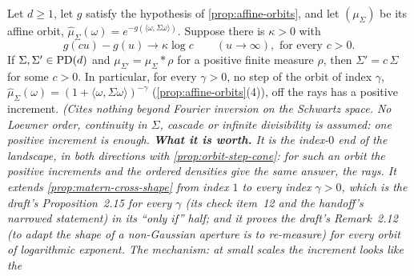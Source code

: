 \begin{proposition}
\label{prop:log-orbit-rays}
\leanok
Let $d \ge 1$, let $g$ satisfy the hypothesis of \ref{prop:affine-orbits}, and let $(\mu_\Sigma)$
be its affine orbit, $\widehat\mu_\Sigma(\omega) = e^{-g(\langle\omega,\Sigma\omega\rangle)}$. Suppose
there is $\kappa > 0$ with
\[
  g(cu) - g(u) \to \kappa\log c \qquad (u \to \infty), \text{ for every } c > 0 .
\]
If $\Sigma, \Sigma' \in \mathrm{PD}(d)$ and $\mu_{\Sigma'} = \mu_\Sigma * \rho$ for a positive finite measure
$\rho$, then $\Sigma' = c\,\Sigma$ for some $c > 0$. In particular, for every $\gamma > 0$, no step
of the \Matern{} orbit of index $\gamma$, $\widehat\mu_\Sigma(\omega) = (1 + \langle\omega,\Sigma
\omega\rangle)^{-\gamma}$ (\ref{prop:affine-orbits}(4)), off the rays has a positive increment.
\statusT\quad\emph{(Cites nothing beyond Fourier inversion on the Schwartz space. No
Loewner order, continuity in $\Sigma$, cascade or infinite divisibility is assumed: one positive
increment is enough. \textbf{What it is worth.} It is the index-$0$ end of the landscape, in both
directions with \ref{prop:orbit-step-cone}: for such an orbit the positive increments and the
ordered \Levy{} densities give the same answer, the rays. It extends \ref{prop:matern-cross-shape}
from index $1$ to every index $\gamma > 0$, which is the draft's Proposition~2.15 for every $\gamma$
(its check item~12 and the handoff's narrowed statement) in its ``only if'' half; and it proves the
draft's Remark~2.12 (\emph{to adapt the shape of a non-Gaussian aperture is to re-measure}) for every
orbit of logarithmic exponent. The mechanism: at small scales the increment looks like the
}
\end{proposition}
